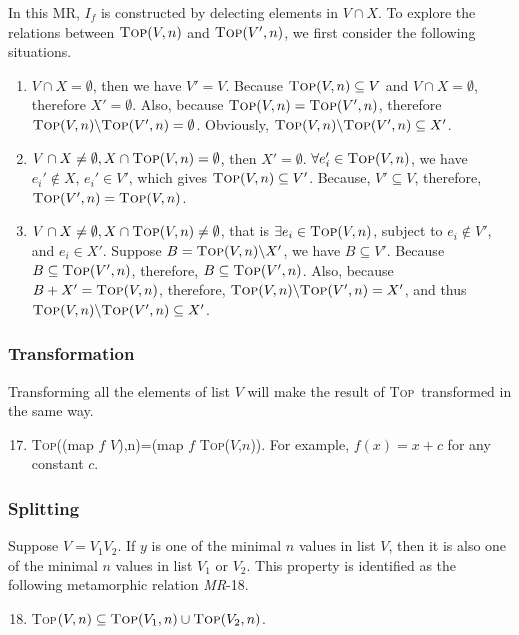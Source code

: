 \documentclass[conference]{IEEEtran}
\theoremstyle{remark}
\newcommand{\Fn}{\textsc{Top}}
\newcommand{\MR}{\textit{MR}}
\begin{document}
In this MR, $I_f$ is constructed by delecting elements in $V \cap X$. To explore the relations between $\Fn(V,n)$ and $\Fn(V',n)$, we first consider the following situations.
\begin{enumerate}[{Situation} 1:]
\item
$V \cap X = \emptyset$, then we have $V' = V$. Because $\Fn(V,n) \subseteq V$ and $V \cap X = \emptyset$, therefore $X' = \emptyset$. Also, because $\Fn(V,n) = \Fn(V',n)$, therefore $\Fn(V,n)\backslash\Fn(V',n) = \emptyset$. Obviously, $\Fn(V,n)\backslash\Fn(V',n)\subseteq X'$.
\item
$V \cap X \neq \emptyset, X \cap \Fn(V,n) = \emptyset$, then $X' = \emptyset$. $\forall e_i' \in \Fn(V,n)$, we have $e_i' \notin X$, $e_i' \in V'$, which gives $\Fn(V,n) \subseteq V'$. Because, $V' \subseteq V$, therefore, $\Fn(V',n) = \Fn(V,n)$. 
\item
$V \cap X \neq \emptyset, X \cap \Fn(V,n) \neq \emptyset$, that is $\exists e_i \in \Fn(V,n)$, subject to $e_i \notin V'$, and $e_i \in X'$. Suppose $B = \Fn(V,n) \backslash X'$, we have $B \subseteq V'$. Because $B \subseteq \Fn(V',n)$, therefore, $B \subseteq \Fn(V',n)$. Also, because $B + X' = \Fn(V,n)$, therefore, $\Fn(V,n) \backslash \Fn(V',n) = X'$, and thus $\Fn(V,n) \backslash \Fn(V',n) \subseteq X'$.
\end{enumerate}

\subsubsection{Transformation}
Transforming all the elements of list $V$ will make the result of \Fn~transformed in the same way.
\begin{enumerate}[\MR-1]
\setcounter{enumi}{16}
\item \Fn((map $f$ $V$),n)=(map $f$ \Fn($V$,$n$)). For example, $f(x)=x+c$ for any constant $c$.
\end{enumerate} 

\subsubsection{Splitting}
Suppose $V=V_1V_2$. If $y$ is one of the minimal $n$ values in list $V$, then it is also one of the minimal $n$ values in list $V_1$ or $V_2$. This property is identified as the following metamorphic relation \MR-18.
\begin{enumerate}[\MR-1]
\setcounter{enumi}{17}
\item \Fn$(V,n)\subseteq\Fn(V_1,n)\cup\Fn(V_2,n)$.
\end{enumerate}
\end{document}
